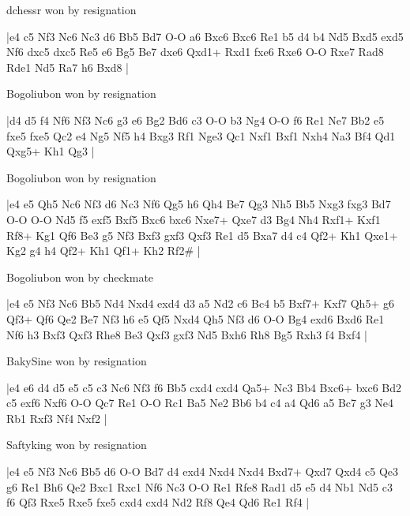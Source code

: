\showboard

dchessr won by resignation

\makegametitle
|e4 c5 Nf3 Nc6 Nc3 d6 Bb5 Bd7 O-O a6 Bxc6 Bxc6 Re1 b5 d4 b4 Nd5 Bxd5 exd5 Nf6 dxc5 dxc5 Re5 e6 Bg5 Be7 dxe6 Qxd1+ Rxd1 fxe6 Rxe6 O-O Rxe7 Rad8 Rde1 Nd5 Ra7 h6 Bxd8  |

\showboard

Bogoliubon won by resignation

\makegametitle
|d4 d5 f4 Nf6 Nf3 Nc6 g3 e6 Bg2 Bd6 c3 O-O b3 Ng4 O-O f6 Re1 Ne7 Bb2 e5 fxe5 fxe5 Qc2 e4 Ng5 Nf5 h4 Bxg3 Rf1 Nge3 Qc1 Nxf1 Bxf1 Nxh4 Na3 Bf4 Qd1 Qxg5+ Kh1 Qg3  |

\showboard

Bogoliubon won by resignation

\makegametitle
|e4 e5 Qh5 Nc6 Nf3 d6 Nc3 Nf6 Qg5 h6 Qh4 Be7 Qg3 Nh5 Bb5 Nxg3 fxg3 Bd7 O-O O-O Nd5 f5 exf5 Bxf5 Bxc6 bxc6 Nxe7+ Qxe7 d3 Bg4 Nh4 Rxf1+ Kxf1 Rf8+ Kg1 Qf6 Be3 g5 Nf3 Bxf3 gxf3 Qxf3 Re1 d5 Bxa7 d4 c4 Qf2+ Kh1 Qxe1+ Kg2 g4 h4 Qf2+ Kh1 Qf1+ Kh2 Rf2\#  |

\showboard

Bogoliubon won by checkmate

\makegametitle
|e4 e5 Nf3 Nc6 Bb5 Nd4 Nxd4 exd4 d3 a5 Nd2 c6 Bc4 b5 Bxf7+ Kxf7 Qh5+ g6 Qf3+ Qf6 Qe2 Be7 Nf3 h6 e5 Qf5 Nxd4 Qh5 Nf3 d6 O-O Bg4 exd6 Bxd6 Re1 Nf6 h3 Bxf3 Qxf3 Rhe8 Be3 Qxf3 gxf3 Nd5 Bxh6 Rh8 Bg5 Rxh3 f4 Bxf4  |

\showboard

BakySine won by resignation

\makegametitle
|e4 e6 d4 d5 e5 c5 c3 Nc6 Nf3 f6 Bb5 cxd4 cxd4 Qa5+ Nc3 Bb4 Bxc6+ bxc6 Bd2 c5 exf6 Nxf6 O-O Qc7 Re1 O-O Rc1 Ba5 Ne2 Bb6 b4 c4 a4 Qd6 a5 Bc7 g3 Ne4 Rb1 Rxf3 Nf4 Nxf2  |

\showboard

Saftyking won by resignation

\makegametitle
|e4 e5 Nf3 Nc6 Bb5 d6 O-O Bd7 d4 exd4 Nxd4 Nxd4 Bxd7+ Qxd7 Qxd4 c5 Qe3 g6 Re1 Bh6 Qe2 Bxc1 Rxc1 Nf6 Nc3 O-O Re1 Rfe8 Rad1 d5 e5 d4 Nb1 Nd5 c3 f6 Qf3 Rxe5 Rxe5 fxe5 cxd4 cxd4 Nd2 Rf8 Qe4 Qd6 Re1 Rf4  |

